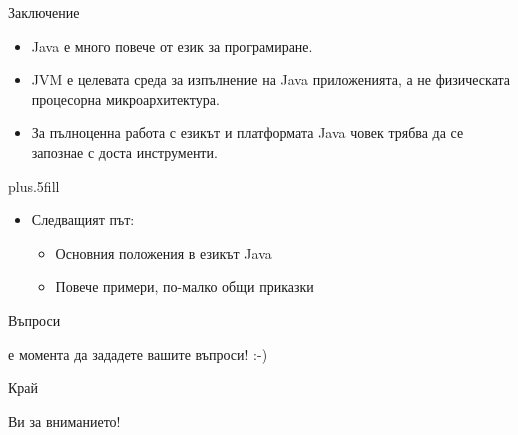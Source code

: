 \documentclass{beamer}
\begin{document}
\begin{frame}{Заключение}

  \begin{itemize}
  \item
    Java \alert{е много повече от език за програмиране}.
  \item
    JVM \alert{е целевата среда за изпълнение} на Java приложенията, а
    не физическата процесорна микроархитектура.
  \item
    За пълноценна работа с езикът и платформата Java човек трябва да
    се запознае с доста инструменти.
  \end{itemize}
  
  \vskip0pt plus.5fill
  \begin{itemize}
  \item
    Следващият път:
    \begin{itemize}
    \item
      Основния положения в езикът Java
    \item
      Повече примери, по-малко общи приказки
    \end{itemize}
  \end{itemize}
\end{frame}


\begin{frame}{Въпроси}
  \begin{center} е момента да зададете вашите въпроси! :-)\end{center}
\end{frame}


\begin{frame}{Край}

  \begin{center}
     Ви за вниманието!
  \end{center}
  
\end{frame}
\end{document}
